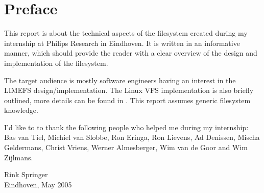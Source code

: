 \chapter{Preface}

This report is about the technical aspects of the filesystem created during my internship at Philips Research in Eindhoven. It is written in an informative manner, which should provide the reader with a clear overview of the design and implementation of the filesystem.

The target audience is mostly software engineers having an interest in the LIMEFS design/implementation. The Linux VFS implementation is also briefly outlined, more details can be found in \cite{LDD}. This report assumes generic filesystem knowledge.

I'd like to to thank the following people who helped me during my internship: Bas van Tiel, Michiel van Slobbe, Ron Eringa, Ron Lievens, Ad Denissen, Mischa Geldermans, Christ Vriens, Werner Almesberger, Wim van de Goor and Wim Zijlmans.

Rink Springer \\
Eindhoven, May 2005
